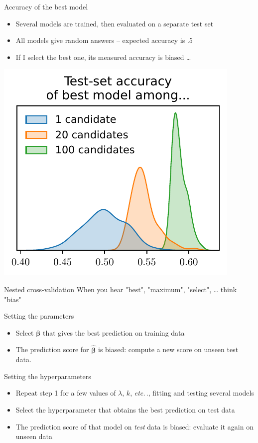 \documentclass[presentation,mathserif,table]{beamer}
\newcommand{\etc}{\emph{etc.}\,}
\newcommand{\bbeta}{{\mathbold \beta}}
\begin{document}
\begin{frame}[label={sec:orgff64d20}]{Accuracy of the best model}
\begin{itemize}
\item Several models are trained, then evaluated on a separate test set
\item All models give random answers -- expected accuracy is .5
\item If I select the best one, its measured accuracy is biased \ldots{}
\end{itemize}
\begin{center}
\includegraphics[height=.5 \textheight]{figures/generated/hyperparameter_overfitting/accuracies.pdf}
\end{center}
\end{frame}
\begin{frame}[label={sec:orgc992771}]{Nested cross-validation}
When you hear "best", "maximum", "select", \ldots{} think "bias"
\begin{block}{Setting the parameters}
\begin{itemize}
\item \alert{Select} \(\bbeta\) that gives the \alert{best} prediction on training data
\item The prediction score for \(\hat{\bbeta}\) is biased: compute a new score on unseen test data.
\end{itemize}
\end{block}
\begin{block}{Setting the hyperparameters}
\begin{itemize}
\item Repeat step 1 for a few values of \(\lambda\), \(k\), \etc., fitting and testing several models
\item \alert{Select} the hyperparameter that obtains the \alert{best} prediction on test data
\item The prediction score of that model on \emph{test} data is biased: evaluate it again on unseen data
\end{itemize}
\end{block}
\end{frame}
\end{document}
